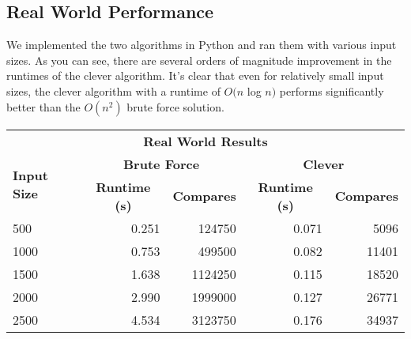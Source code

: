 \documentclass[12pt]{report}
\begin{document}
\subsection*{Real World Performance}

We implemented the two algorithms in Python and ran them with various input sizes. 
As you can see, there are several orders of magnitude improvement in the runtimes of the clever algorithm. 
It’s clear that even for relatively small in‌‌‌‌‌‌put sizes, the clever algorithm with a runtime of $O(n$ log $n)$
performs significantly better than the $O(n^2)$ brute force solution.


\begin{table}[hbt!]
\centering
\begin{tabular}{lrrrr}
\multicolumn{5}{c}{\textbf{Real World Results}}                                                                                                                                                           \\
\multirow{2}{*}{\textbf{Input Size}} & \multicolumn{2}{c}{\textbf{Brute Force}}                                     & \multicolumn{2}{c}{\textbf{Clever}}                                          \\
                                        & \multicolumn{1}{c}{\textbf{Runtime (s)}} & \multicolumn{1}{c}{\textbf{Compares}} & \multicolumn{1}{c}{\textbf{Runtime (s)}} & \multicolumn{1}{c}{\textbf{Compares}} \\
500                                  & 0.251                                & 124750                                & 0.071                                & 5096                                  \\
1000                                 & 0.753                                & 499500                                & 0.082                                & 11401                                 \\
1500                                 & 1.638                                & 1124250                               & 0.115                                & 18520                                 \\
2000                                 & 2.990                                & 1999000                               & 0.127                                & 26771                                 \\
2500                                 & 4.534                                & 3123750                               & 0.176                                & 34937                                 \\

\end{tabular}
\end{table}
\end{document}
